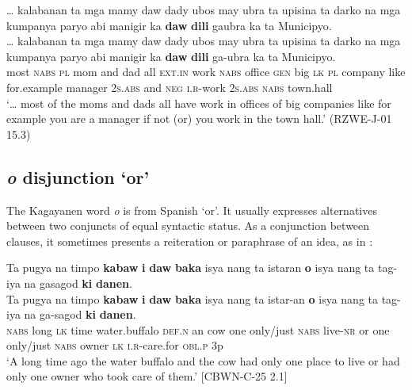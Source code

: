 \ea
… kalabanan ta mga mamy daw dady ubos may ubra ta upisina ta darko na mga kumpanya paryo abi manigir ka \textbf{daw} \textbf{dili} gaubra ka ta Municipyo.\\\smallskip
\gll … kalabanan ta mga mamy daw dady ubos may ubra ta upisina ta darko na mga kumpanya paryo abi manigir ka \textbf{daw} \textbf{dili} ga-ubra ka ta Municipyo. \\
{} most \textsc{nabs} \textsc{pl} mom and dad all \textsc{ext.in} work \textsc{nabs} office \textsc{gen} big \textsc{lk} \textsc{pl} company like for.example manager 2\textsc{s.abs} and \textsc{neg} \textsc{i.r}-work 2\textsc{s.abs} \textsc{nabs} town.hall \\
\glt ‘… most of the moms and dads all have work in offices of big companies like for example you are a manager if not (or) you work in the town hall.’ (RZWE-J-01 15.3)
\z

\subsection{\textit{o} disjunction ‘or’}
\label{sec:o}
The Kagayanen word \textit{o} is from Spanish ‘or’. It usually expresses alternatives between two conjuncts of equal syntactic status. As a conjunction between clauses, it sometimes presents a reiteration or paraphrase of an idea, as in :

\ea
\label{ex:tookcareofthem}
Ta pugya na timpo \textbf{kabaw} \textbf{i} \textbf{daw} \textbf{baka} isya nang ta istaran \textbf{o} isya nang ta tag-iya na gasagod \textbf{ki} \textbf{danen}.\\\smallskip
\gll Ta pugya na timpo \textbf{kabaw} \textbf{i} \textbf{daw} \textbf{baka} isya nang ta istar-an \textbf{o} isya nang ta tag-iya na ga-sagod \textbf{ki} \textbf{danen}. \\
\textsc{nabs} long \textsc{lk} time water.buffalo \textsc{def.n} an cow one only/just \textsc{nabs} live-\textsc{nr} or one only/just \textsc{nabs} owner \textsc{lk} \textsc{i.r}-care.for \textsc{obl.p} 3p \\
\glt ‘A long time ago the water buffalo and the cow had only one place to live or had only one owner who took care of them.’ [CBWN-C-25 2.1]
\z

